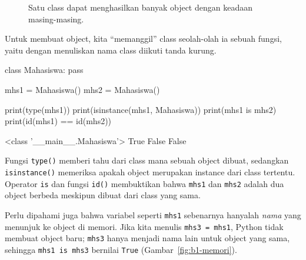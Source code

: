 \begin{figure}[htbp]
\centering
{}
\caption{Satu class dapat menghasilkan banyak object dengan keadaan masing-masing.}
\end{figure}

Untuk membuat object, kita ``memanggil'' class seolah-olah ia sebuah fungsi, yaitu dengan menuliskan nama class diikuti tanda kurung.

\begin{kode}
class Mahasiswa:
    pass

mhs1 = Mahasiswa()
mhs2 = Mahasiswa()

print(type(mhs1))
print(isinstance(mhs1, Mahasiswa))
print(mhs1 is mhs2)
print(id(mhs1) == id(mhs2))
\end{kode}

\begin{keluaran}
<class '__main__.Mahasiswa'>
True
False
False
\end{keluaran}

Fungsi \texttt{type()} memberi tahu dari class mana sebuah object dibuat, sedangkan \texttt{isinstance()} memeriksa apakah object merupakan instance dari class tertentu. Operator \texttt{is} dan fungsi \texttt{id()} membuktikan bahwa \texttt{mhs1} dan \texttt{mhs2} adalah dua object berbeda meskipun dibuat dari class yang sama.

Perlu dipahami juga bahwa variabel seperti \texttt{mhs1} sebenarnya hanyalah \emph{nama} yang menunjuk ke object di memori. Jika kita menulis \texttt{mhs3 = mhs1}, Python tidak membuat object baru; \texttt{mhs3} hanya menjadi nama lain untuk object yang sama, sehingga \texttt{mhs1 is mhs3} bernilai \texttt{True} (Gambar~\ref{fig:b1-memori}).

